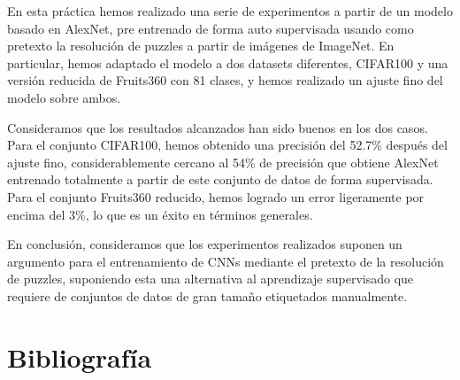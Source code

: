 \documentclass[10pt,a4paper]{article}
\begin{document}
En esta práctica hemos realizado una serie de experimentos a partir de un modelo basado en AlexNet, pre entrenado de forma auto supervisada usando como pretexto la resolución de puzzles a partir de imágenes de ImageNet. En particular, hemos adaptado el modelo a dos datasets diferentes, CIFAR100 y una versión reducida de Fruits360 con 81 clases, y hemos realizado un ajuste fino del modelo sobre ambos.

Consideramos que los resultados alcanzados han sido buenos en los dos casos. Para el conjunto CIFAR100, hemos obtenido una precisión del 52.7\% después del ajuste fino, considerablemente cercano al 54\% de precisión que obtiene AlexNet entrenado totalmente a partir de este conjunto de datos de forma supervisada. Para el conjunto Fruits360 reducido, hemos logrado un error ligeramente por encima del 3\%, lo que es un éxito en términos generales.

En conclusión, consideramos que los experimentos realizados suponen un argumento para el entrenamiento de CNNs mediante el pretexto de la resolución de puzzles, suponiendo esta una alternativa al aprendizaje supervisado que requiere de conjuntos de datos de gran tamaño etiquetados manualmente.




\newpage
\section{Bibliografía}
\end{document}
